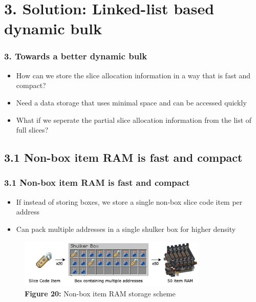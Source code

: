 \documentclass[aspectratio=169]{beamer}
\begin{document}
\section{3. Solution: Linked-list based dynamic bulk}


\begin{frame}
	\frametitle{3. Towards a better dynamic bulk}

    \begin{itemize}
		\item How can we store the slice allocation information in a way that is fast and compact?
		\item Need a data storage that uses minimal space and can be accessed quickly
		\item What if we seperate the partial slice allocation information from the list of full slices?
	\end{itemize}
\end{frame}


\subsection{3.1 Non-box item RAM is fast and compact}

\begin{frame}
	\frametitle{3.1 Non-box item RAM is fast and compact}

    \begin{itemize}
		\item If instead of storing boxes, we store a single non-box slice code item per address
		\item Can pack multiple addresses in a single shulker box for higher density
	\end{itemize}
    \begin{figure}
        \includegraphics[width=0.8\textwidth]{nonboxlayout.png}
        \caption{\textbf{Figure 20:} Non-box item RAM storage scheme}
    \end{figure}
\end{frame}
\end{document}
